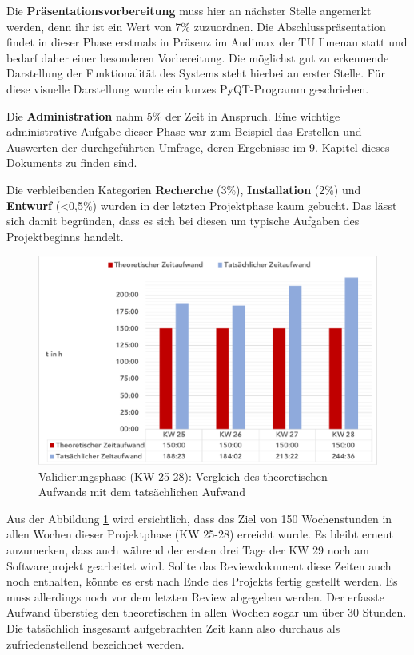 \documentclass[../review_3.tex]{subfiles}
\begin{document}
Die \textbf{Präsentationsvorbereitung} muss hier an nächster Stelle angemerkt werden, denn ihr ist ein Wert von 7\% zuzuordnen. Die Abschlusspräsentation findet in dieser Phase erstmals in Präsenz im Audimax der TU Ilmenau statt und bedarf daher einer besonderen Vorbereitung. Die möglichst gut zu erkennende Darstellung der Funktionalität des Systems steht hierbei an erster Stelle. Für diese visuelle Darstellung wurde ein kurzes PyQT-Programm geschrieben.

Die \textbf{Administration} nahm 5\% der Zeit in Anspruch. Eine wichtige administrative Aufgabe dieser Phase war zum Beispiel das Erstellen und Auswerten der durchgeführten Umfrage, deren Ergebnisse im 9. Kapitel dieses Dokuments zu finden sind.

Die verbleibenden Kategorien \textbf{Recherche} (3\%), \textbf{Installation} (2\%) und \textbf{Entwurf} (<0,5\%) wurden in der letzten Projektphase kaum gebucht. Das lässt sich damit begründen, dass es sich bei diesen um typische Aufgaben des Projektbeginns handelt.

\begin{figure} [h]
    \centering
    \includegraphics[width = \linewidth, trim=5pt 5pt 5pt 5pt, clip]{img/phase3.pdf}
    \caption{Validierungsphase (KW 25-28): Vergleich des theoretischen Aufwands mit dem tatsächlichen Aufwand}
    \label{kimai14}
\end{figure}

Aus der Abbildung \ref{kimai14} wird ersichtlich, dass das Ziel von 150 Wochenstunden in allen Wochen dieser Projektphase (KW 25-28) erreicht wurde. Es bleibt erneut anzumerken, dass auch während der ersten drei Tage der KW 29 noch am Softwareprojekt gearbeitet wird. Sollte das Reviewdokument diese Zeiten auch noch enthalten, könnte es erst nach Ende des Projekts fertig gestellt werden. Es muss allerdings noch vor dem letzten Review abgegeben werden. Der erfasste Aufwand überstieg den theoretischen in allen Wochen sogar um über 30 Stunden. Die tatsächlich insgesamt aufgebrachten Zeit kann also durchaus als zufriedenstellend bezeichnet werden.
\end{document}
